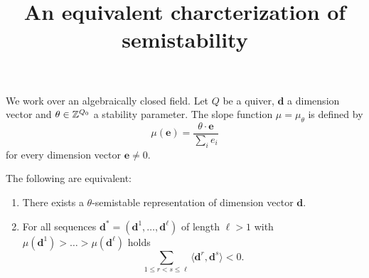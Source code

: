 \documentclass[a4paper]{article}
\title{An equivalent charcterization of semistability}
\author{}
\begin{document}
\maketitle

We work over an algebraically closed field. Let $Q$ be a quiver, $\mathbf{d}$ a dimension vector and $\theta \in \mathbb{Z}^{Q_0}$ a stability parameter. The slope function $\mu = \mu_\theta$ is defined by
\[
    \mu(\mathbf{e}) = \frac{\theta\cdot \mathbf{e}}{\sum_i e_i}    
\]
for every dimension vector $\mathbf{e} \neq 0$.

\begin{proposition}
    The following are equivalent:
    \begin{enumerate}
        \item There exists a $\theta$-semistable representation of dimension vector $\mathbf{d}$.
        \item For all sequences $\mathbf{d}^* = (\mathbf{d}^1,\ldots,\mathbf{d}^\ell)$ of length $\ell > 1$ with $\mu(\mathbf{d}^1) > \ldots > \mu(\mathbf{d}^\ell)$ holds
        \[
            \sum_{1 \leq r < s \leq \ell} \langle \mathbf{d}^r, \mathbf{d}^s \rangle < 0.    
        \]
    \end{enumerate}
\end{proposition}
\end{document}
